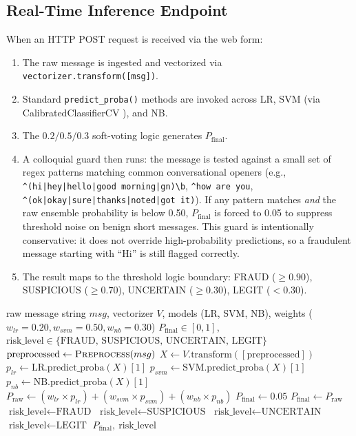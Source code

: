 \subsection{Real-Time Inference Endpoint}
When an HTTP POST request is received via the web form:
\begin{enumerate}
    \item The raw message is ingested and vectorized via \texttt{vectorizer.transform([msg])}.
    \item Standard \texttt{predict\_proba()} methods are invoked across LR, SVM (via CalibratedClassifierCV \cite{platt1999probabilistic}), and NB.
    \item The $0.2/0.5/0.3$ soft-voting logic generates $P_{\text{final}}$.
    \item A colloquial guard then runs: the message is tested against a small set of regex patterns matching common conversational openers (e.g., \texttt{\textasciicircum(hi|hey|hello|good morning|gn)\textbackslash b}, \texttt{\textasciicircum how are you}, \texttt{\textasciicircum(ok|okay|sure|thanks|noted|got it)}). If any pattern matches \emph{and} the raw ensemble probability is below 0.50, $P_{\text{final}}$ is forced to 0.05 to suppress threshold noise on benign short messages. This guard is intentionally conservative: it does not override high-probability predictions, so a fraudulent message starting with ``Hi'' is still flagged correctly.
    \item The result maps to the threshold logic boundary: FRAUD ($\geq 0.90$), SUSPICIOUS ($\geq 0.70$), UNCERTAIN ($\geq 0.30$), LEGIT ($< 0.30$).
\end{enumerate}

\begin{algorithm}[h]
\caption{Soft-Voting Ensemble Inference}\label{alg:soft_voting}
\begin{algorithmic}[1]
\Require raw message string $msg$, vectorizer $V$, models (LR, SVM, NB), weights ($w_{lr}=0.20, w_{svm}=0.50, w_{nb}=0.30$)
\Ensure $P_{\text{final}} \in [0,1]$, $\text{risk\_level} \in \{\text{FRAUD, SUSPICIOUS, UNCERTAIN, LEGIT}\}$
\State $\text{preprocessed} \gets \textsc{Preprocess}(msg)$
\State $X \gets V.\text{transform}([\text{preprocessed}])$
\State $p_{lr} \gets \text{LR.predict\_proba}(X)[1]$
\State $p_{svm} \gets \text{SVM.predict\_proba}(X)[1]$ 
\State $p_{nb} \gets \text{NB.predict\_proba}(X)[1]$
\State $P_{\text{raw}} \gets (w_{lr} \times p_{lr}) + (w_{svm} \times p_{svm}) + (w_{nb} \times p_{nb})$
    \State $P_{\text{final}} \gets 0.05$ 
\Else
    \State $P_{\text{final}} \gets P_{\text{raw}}$
\EndIf
{}
    \State $\text{risk\_level} \gets \text{FRAUD}$
    \State $\text{risk\_level} \gets \text{SUSPICIOUS}$
    \State $\text{risk\_level} \gets \text{UNCERTAIN}$
\Else
    \State $\text{risk\_level} \gets \text{LEGIT}$
\EndIf
\State \Return $P_{\text{final}},\ \text{risk\_level}$
\end{algorithmic}
\end{algorithm}

